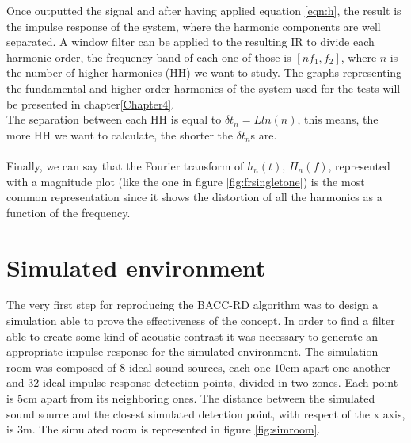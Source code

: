 Once outputted the signal and after having applied equation \ref{eqn:h}, the result is the impulse response of the system, where the harmonic components are well separated. A window filter can be applied to the resulting IR to divide each harmonic order, the frequency band of each one of those is $[nf_1, f_2]$, where $n$ is the number of higher harmonics (HH) we want to study. The graphs representing the fundamental and higher order harmonics of the system used for the tests will be presented in chapter\ref{Chapter4}.
\\
The separation between each HH is equal to $\delta t_n = L ln(n)$, this means, the more HH we want to calculate, the shorter the $\delta t_n$s are.
\\
\\
Finally, we can say that the Fourier transform of $h_n(t)$, $H_n(f)$, represented with a magnitude plot (like the one in figure \ref{fig:frsingletone}) is the most common
representation since it shows the distortion of all the harmonics as a function of the frequency.

\section{Simulated environment}
\label{sec:simenv}

The very first step for reproducing the \parencite{cai_time-domain_2014} BACC-RD algorithm was to design a simulation able to prove the effectiveness of the concept. In order to find a filter able to create some kind of acoustic contrast it was necessary to generate an appropriate impulse response for the simulated environment. The simulation room was composed of 8 ideal sound sources, each one $10$cm apart one another and 32 ideal impulse response detection points, divided in two zones. Each point is $5$cm apart from its neighboring ones. The distance between the simulated sound source and the closest simulated detection point, with respect of the x axis, is $3$m. The simulated room is represented in figure \ref{fig:simroom}.

